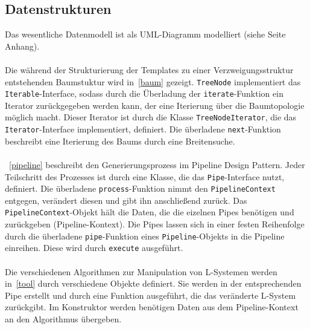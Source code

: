\subsection*{Datenstrukturen}
Das wesentliche Datenmodell ist als UML-Diagramm modelliert (siehe Seite~\pageref{anhang} Anhang).\\~\\
Die während der Strukturierung der Templates zu einer Verzweigungsstruktur entstehenden Baumstuktur wird in~\ref{baum} gezeigt.
\texttt{TreeNode} implementiert das \texttt{Iterable}-Interface, sodass durch die Überladung der \texttt{iterate}-Funktion
ein Iterator zurückgegeben werden kann, der eine Iterierung über die Baumtopologie möglich macht.
Dieser Iterator ist durch die Klasse \texttt{TreeNodeIterator}, die das \texttt{Iterator}-Interface implementiert, definiert.
Die überladene \texttt{next}-Funktion beschreibt eine Iterierung des Baums durch eine Breitensuche.\\~\\
~\ref{pipeline} beschreibt den Generierungsprozess im Pipeline Design Pattern.
Jeder Teilschritt des Prozesses ist durch eine Klasse, die das \texttt{Pipe}-Interface nutzt, definiert.
Die überladene \texttt{process}-Funktion nimmt den \texttt{PipelineContext} entgegen, verändert diesen und gibt ihn
anschließend zurück.
Das \texttt{PipelineContext}-Objekt hält die Daten, die die eizelnen Pipes benötigen und zurückgeben (Pipeline-Kontext).
Die Pipes lassen sich in einer festen Reihenfolge durch die überladene \texttt{pipe}-Funktion eines
\texttt{Pipeline}-Objekts in die Pipeline einreihen.
Diese wird durch \texttt{execute} ausgeführt.\\~\\
Die verschiedenen Algorithmen zur Manipulation von L-Systemen werden in~\ref{tool} durch verschiedene Objekte definiert.
Sie werden in der entsprechenden Pipe erstellt und durch eine Funktion ausgeführt, die das veränderte L-System
zurückgibt.
Im Konstruktor werden benötigen Daten aus dem Pipeline-Kontext an den Algorithmus übergeben.
